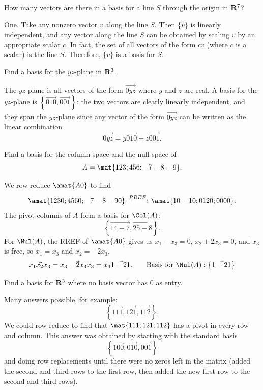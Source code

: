 \begin{problems}
\problem How many vectors are there in a basis for a line $S$ through the origin
in ${\bf R}^7$? %

\begin{solution}
  One.  Take any nonzero vector $v$ along the line $S$.  Then $\{v\}$ is
  linearly independent, and any vector along the line $S$ can be obtained by
  scaling $v$ by an appropriate scalar $c$.  In fact, the set of all vectors of
  the form $cv$ (where $c$ is a scalar) is the line $S$. Therefore, $\{v\}$ is a
  basis for $S$.
\end{solution}

\problem Find a basis for the $yz$-plane in ${\bf R}^3$. %

\begin{solution}
  The $yz$-plane is all vectors of the form $\vec{0 y z}$ where $y$ and $z$ are
  real.  A basis for the $yz$-plane is
  $\left\{\vec{0 1 0}, \vec{0 0 1}\right\}$: the two vectors are clearly
  linearly independent, and they span the $yz$-plane since any vector of the
  form $\vec{0 y z}$ can be written as the linear combination
\[\vec{0 y z} = y \vec{0 1 0} + z \vec{0 0 1}.\]
\end{solution}


\problem Find a basis for the column space and the null space of
\[A = \mat{1 2 3; 4 5 6; -7 -8 -9}.\] %

\begin{solution}
We row-reduce $\amat{A 0}$ to find
\[\amat{1 2 3 0; 4 5 6 0; -7 -8 -9 0}
\xrightarrow[]{RREF} 
\amat{1 0 -1 0; 0 1 2 0; 0 0 0 0}.\]
The pivot columns of $A$ form a basis for $\Col(A)$:
\[\left\{\vec{1 4 -7}, \vec{2 5 -8}\right\}.\]
For $\Nul(A)$, the RREF of $\amat{A 0}$ gives us $x_1 - x_3 = 0$, $x_2 + 2x_3 = 0$, and $x_3$ is free, so $x_1 = x_3$ and $x_2 = -2x_3$.
\[\vec{x_1 x_2 x_3} = \vec{x_3 -2x_3 x_3} = x_3 \vec{1 -2 1}.
\qquad \textup{Basis for } \Nul(A): \left\{\vec{1 -2 1}\right\}\]
\end{solution}

\problem Find a basis for ${\bf R}^3$ where no basis vector has $0$ as entry. %

\begin{solution}
Many answers possible, for example:
\[\left\{\vec{1 1 1}, \vec{1 2 1}, \vec{1 1 2}\right\}.\]
We could row-reduce to find that $\mat{1 1 1; 1 2 1; 1 1 2}$ has a pivot in
every row and column. \newline This answer was obtained by starting with the
standard basis
\[\left\{\vec{1 0 0}, \vec{0 1 0}, \vec{0 0 1}\right\}\]
and doing row replacements until there were no zeros left in the matrix (added the second and third rows to the first row, then added the new first row to the second and third rows).
\end{solution}


\end{problems}
